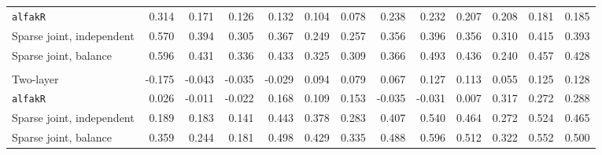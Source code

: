\begin{center}
\begin{tabular}{l*{12}{r}}
\quad \texttt{alfakR} & 0.314 & 0.171 & 0.126 & 0.132 & 0.104 & 0.078 & 0.238 & 0.232 & 0.207 & 0.208 & 0.181 & 0.185 \\
\quad Sparse joint, independent & 0.570 & 0.394 & 0.305 & 0.367 & 0.249 & 0.257 & 0.356 & 0.396 & 0.356 & 0.310 & 0.415 & 0.393 \\
\quad Sparse joint, balance & 0.596 & 0.431 & 0.336 & 0.433 & 0.325 & 0.309 & 0.366 & 0.493 & 0.436 & 0.240 & 0.457 & 0.428 \\
\addlinespace[2pt]
\multicolumn{13}{l}{\textit{3000/100, 360 d}} \\
\quad Two-layer & -0.175 & -0.043 & -0.035 & -0.029 & 0.094 & 0.079 & 0.067 & 0.127 & 0.113 & 0.055 & 0.125 & 0.128 \\
\quad \texttt{alfakR} & 0.026 & -0.011 & -0.022 & 0.168 & 0.109 & 0.153 & -0.035 & -0.031 & 0.007 & 0.317 & 0.272 & 0.288 \\
\quad Sparse joint, independent & 0.189 & 0.183 & 0.141 & 0.443 & 0.378 & 0.283 & 0.407 & 0.540 & 0.464 & 0.272 & 0.524 & 0.465 \\
\quad Sparse joint, balance & 0.359 & 0.244 & 0.181 & 0.498 & 0.429 & 0.335 & 0.488 & 0.596 & 0.512 & 0.322 & 0.552 & 0.500 \\
\bottomrule
\end{tabular}
\end{center}


